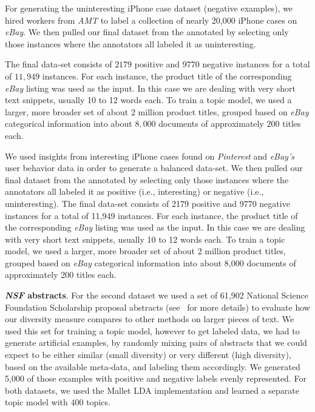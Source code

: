 For generating the uninteresting iPhone case dataset (negative examples), we
hired workers from {\em AMT} to label a collection
of nearly 20,000 iPhone cases on {\em eBay}.  We then pulled our final dataset from the annotated by selecting only those instances where the annotators all labeled it as uninteresting. 

The final data-set consists of $2179$ positive and $9770$ negative instances
for a total of $11,949$ instances. For each instance, the product title of
the corresponding {\em eBay} listing was used as the input. In this case we are
dealing with very short text snippets, usually 10 to 12 words each. To
train a topic model, we used a larger, more broader set of about
$2$ million product titles, grouped based on {\em eBay} categorical information into about $8,000$
documents of approximately $200$ titles each.


We used insights from 
interesting iPhone cases found on {\em Pinterest} and {\em eBay's}
user behavior data in order to generate a balanced data-set.  
We then pulled our final dataset from the annotated by selecting only
those instances where the annotators all labeled it as 
positive (i.e., interesting) or negative (i.e., uninteresting). The
final data-set consists of 2179 positive and 9770 negative instances
for a total of 11,949 instances. For each instance, the product title of
the corresponding {\em eBay} listing was used as the input. In this case we are
dealing with very short text snippets, usually 10 to 12 words each. To
train a topic model, we used a larger, more broader set of about
2 million product titles, grouped based on {\em eBay} categorical information into about 8,000
documents of approximately 200 titles each.

{\bf {\em NSF} abstracts}. For the second dataset we used a set of
61,902 National Science Foundation 
Scholarship proposal abstracts (see~\cite{bache:2013} for more
details) to evaluate how our diversity measure 
compares to other methods on larger pieces of text. We used this set
for training a topic model, however to get labeled data, we had to
generate artificial examples, by randomly mixing pairs of abstracts that we
could expect to be either similar (small diversity) or very different
(high diversity), based on the available meta-data, and labeling them accordingly. We generated 5,000 of
those examples with positive and negative labels evenly represented. For both datasets, we used the Mallet LDA implementation and learned a separate topic model with $400$ topics.

